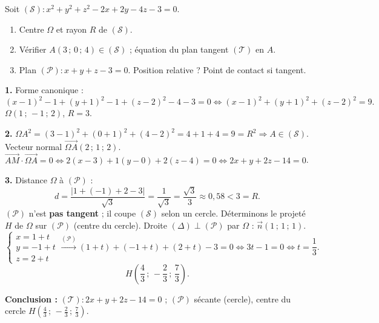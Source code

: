 \documentclass[11pt]{article}
\begin{document}
\begin{exoresolu}
Soit $(\mathcal{S}) : x^2+y^2+z^2-2x+2y-4z-3=0$.
\begin{enumerate}
\item Centre $\Omega$ et rayon $R$ de $(\mathcal{S})$.
\item Vérifier $A(3\,;\,0\,;\,4)\in(\mathcal{S})$ ; équation du plan tangent $(\mathcal{T})$ en $A$.
\item Plan $(\mathcal{P}) : x+y+z-3=0$. Position relative ? Point de contact si tangent.
\end{enumerate}
\tcblower
\textbf{1.} Forme canonique :
\[ (x-1)^2-1+(y+1)^2-1+(z-2)^2-4-3=0 \iff (x-1)^2+(y+1)^2+(z-2)^2=9. \]
$\Omega(1\,;\,-1\,;\,2)$, $R=3$.

\textbf{2.} $\Omega A^2=(3-1)^2+(0+1)^2+(4-2)^2=4+1+4=9=R^2 \Rightarrow A\in(\mathcal{S})$.
Vecteur normal $\overrightarrow{\Omega A}(2\,;\,1\,;\,2)$.
$\overrightarrow{AM}\cdot\overrightarrow{\Omega A}=0 \iff 2(x-3)+1(y-0)+2(z-4)=0 \iff \boxed{2x+y+2z-14=0}$.

\textbf{3.} Distance $\Omega$ à $(\mathcal{P})$ :
\[ d=\frac{|1+(-1)+2-3|}{\sqrt{3}}=\frac{1}{\sqrt{3}}=\frac{\sqrt{3}}{3}\approx 0,58 < 3=R. \]
$(\mathcal{P})$ n'est \textbf{pas tangent} ; il coupe $(\mathcal{S})$ selon un cercle.
Déterminons le projeté $H$ de $\Omega$ sur $(\mathcal{P})$ (centre du cercle).
Droite $(\Delta)\perp(\mathcal{P})$ par $\Omega$ : $\vec{n}(1\,;\,1\,;\,1)$.
\[ \begin{cases} x=1+t \\ y=-1+t \\ z=2+t \end{cases} \xrightarrow{(\mathcal{P})} (1+t)+(-1+t)+(2+t)-3=0 \iff 3t-1=0 \iff t=\frac{1}{3}. \]
\[ H\left(\frac{4}{3}\,;\,-\frac{2}{3}\,;\,\frac{7}{3}\right). \]

\textbf{Conclusion :} $(\mathcal{T}) : 2x+y+2z-14=0$ ; $(\mathcal{P})$ sécante (cercle), centre du cercle $H\left(\frac{4}{3}\,;\,-\frac{2}{3}\,;\,\frac{7}{3}\right)$.
\end{exoresolu}
\end{document}
